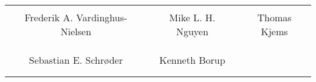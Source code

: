 \begin{table}[H]
	\centering
		\begin{tabular}{ccc}
			\underline{\phantom{mmmmmmmmmmmmmm}} & \underline{\phantom{mmmmmmmmmmmmm}} & \underline{\phantom{mmmmmmmmmmmmm}} \\
			Frederik A. Vardinghus-Nielsen			& Mike L. H. Nguyen 		& Thomas Kjems 			\\
			&&\\
			&&\\
			\underline{\phantom{mmmmmmmmmmmmmm}} & \underline{\phantom{mmmmmmmmmmmmm}} \\
			Sebastian E. Schrøder			& Kenneth Borup 				\\
			&&\\
			&&\\
											
		\end{tabular}
\end{table}